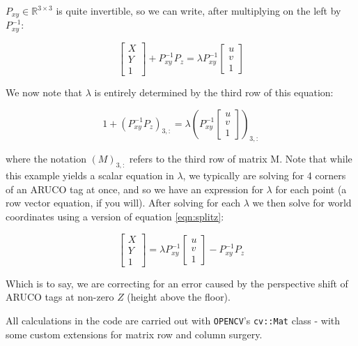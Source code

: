 \documentclass[11pt]{article}
\begin{document}
$P_{xy} \in \mathbb{R}^{3 \times 3}$ is quite invertible, so we can write, after multiplying on the left by $P^{-1}_{xy}$:

\begin{equation}
\label{eqn:splitz}
\begin{bmatrix}
X \\
Y \\
1
\end{bmatrix}
+
P^{-1}_{xy} P_z
= \lambda P^{-1}_{xy} \begin{bmatrix}
u \\
v \\
1
\end{bmatrix}
\end{equation}

We now note that $\lambda$ is entirely determined by the third row of this equation:

\begin{equation}
1
+
\left(P^{-1}_{xy} P_z \right)_{3,:}
= \lambda \left( P^{-1}_{xy} \begin{bmatrix}
u \\
v \\
1
\end{bmatrix}
\right)_{3,:}
\end{equation}

where the notation $(M)_{3,:}$ refers to the third row of matrix M. Note that while this example yields a scalar equation in $\lambda$, we typically are solving for 4 corners of an ARUCO tag at once, and so we have an expression for $\lambda$ for each point (a row vector equation, if you will). After solving for each $\lambda$ we then solve for world coordinates using a version of equation \ref{eqn:splitz}:

\begin{equation}
\begin{bmatrix}
X \\
Y \\
1
\end{bmatrix}
=
\lambda P^{-1}_{xy} \begin{bmatrix}
u \\
v \\
1
\end{bmatrix}
- P^{-1}_{xy} P_z
\end{equation}

Which is to say, we are correcting for an error caused by the perspective shift of ARUCO tags at non-zero $Z$ (height above the floor).

All calculations in the code are carried out with \texttt{OPENCV}'s \texttt{cv::Mat} class - with some custom extensions for matrix row and column surgery.
\end{document}
